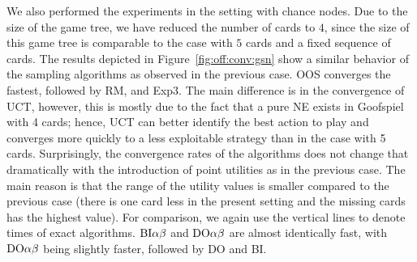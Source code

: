 {We also performed the experiments in the setting with chance nodes.
Due to the size of the game tree, we have reduced the number of cards to $4$, since the size of this game tree is comparable to the case with $5$ cards and a fixed sequence of cards.
The results depicted in Figure~\ref{fig:off:conv:gsn} show a similar behavior of the sampling algorithms as observed in the previous case.
OOS converges the fastest, followed by RM, and Exp3.
The main difference is in the convergence of UCT, however, this is mostly due to the fact that a pure NE exists in Goofspiel with 4 cards; hence, UCT can better
identify the best action to play and converges more quickly to a less exploitable strategy than in the case with 5 cards.
Surprisingly, the convergence rates of the algorithms does not change that dramatically with the introduction of point utilities as in the previous case.
The main reason is that the range of the utility values is smaller compared to the previous case (there is one card less in the present setting and the missing cards has the highest value).
For comparison, we again use the vertical lines to denote times of exact algorithms.
$\textrm{BI}\alpha\beta$ and $\textrm{DO}\alpha\beta$ are almost identically fast, with $\textrm{DO}\alpha\beta$ being slightly faster, followed by \textsc{DO} and \textsc{BI}.
}

